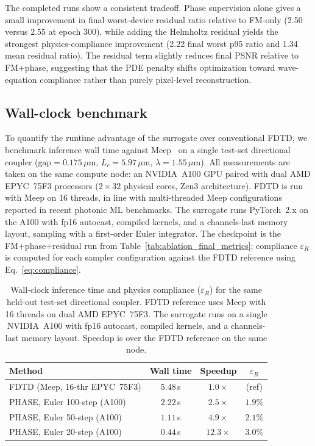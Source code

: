 \documentclass[%
 reprint,
 amsmath,amssymb,
 aps,
floatfix,
]{revtex4-2}
\begin{document}
The completed runs show a consistent tradeoff. Phase supervision alone gives a small improvement in final worst-device residual ratio relative to FM-only (2.50 versus 2.55 at epoch 300), while adding the Helmholtz residual yields the strongest physics-compliance improvement (2.22 final worst p95 ratio and 1.34 mean residual ratio). The residual term slightly reduces final PSNR relative to FM+phase, suggesting that the PDE penalty shifts optimization toward wave-equation compliance rather than purely pixel-level reconstruction.

\subsection{\label{sec:walltime}Wall-clock benchmark}

To quantify the runtime advantage of the surrogate over conventional FDTD, we benchmark inference wall time against Meep~\cite{Oskooi2010Meep} on a single test-set directional coupler ($\mathrm{gap}=0.175\,\mu$m, $L_c=5.97\,\mu$m, $\lambda=1.55\,\mu$m). All measurements are taken on the same compute node: an NVIDIA~A100 GPU paired with dual AMD EPYC~75F3 processors ($2\times32$ physical cores, Zen3 architecture). FDTD is run with Meep on 16 threads, in line with multi-threaded Meep configurations reported in recent photonic ML benchmarks. The surrogate runs PyTorch~2.x on the A100 with fp16 autocast, compiled kernels, and a channels-last memory layout, sampling with a first-order Euler integrator. The checkpoint is the FM+phase+residual run from Table~\ref{tab:ablation_final_metrics}; compliance $\varepsilon_R$ is computed for each sampler configuration against the FDTD reference using Eq.~\eqref{eq:compliance}.

\begin{table}[!htbp]
\centering
\caption{Wall-clock inference time and physics compliance ($\varepsilon_R$) for the same held-out test-set directional coupler. FDTD reference uses Meep with 16 threads on dual AMD EPYC~75F3. The surrogate runs on a single NVIDIA~A100 with fp16 autocast, compiled kernels, and a channels-last memory layout. Speedup is over the FDTD reference on the same node.}
\label{tab:walltime}
\begin{ruledtabular}
\begin{tabular}{lccc}
Method & Wall time & Speedup & $\varepsilon_R$ \\
\hline
FDTD (Meep, 16-thr EPYC~75F3)    & $5.48$\,s   & $1.0\times$  & (ref) \\
PHASE, Euler 100-step (A100)     & $2.22$\,s   & $2.5\times$  & $1.9\%$ \\
PHASE, Euler 50-step  (A100)     & $1.11$\,s   & $4.9\times$  & $2.1\%$ \\
PHASE, Euler 20-step  (A100)     & $0.44$\,s   & $12.3\times$ & $3.0\%$ \\
\end{tabular}
\end{ruledtabular}
\end{table}
\end{document}

